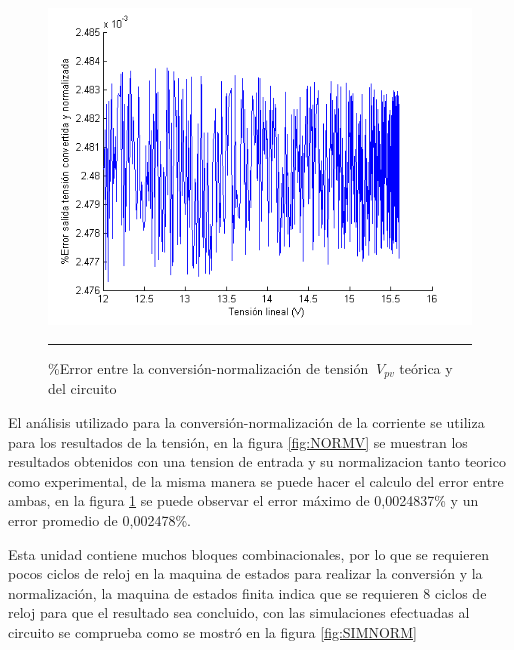   \begin{figure}[H]
  \centering
    \includegraphics[scale=0.7]{./ERROR_CONV_NORM_V.png}
    \rule{35em}{0.5pt}
  \caption[\%Error entre la conversión-normalización de tensión $\ V_{pv}$ teórica y del circuito]{\%Error entre la conversión-normalización de tensión $\ V_{pv}$ teórica y del circuito}
  \label{fig:ENORMV}
\end{figure}

El análisis utilizado para la conversión-normalización de la corriente se utiliza para los resultados de la tensión, en la figura \ref{fig:NORMV} se muestran los resultados obtenidos con una tension de entrada y su normalizacion tanto teorico como experimental, de la misma manera se puede hacer el calculo del error entre ambas, en la figura \ref{fig:ENORMV} se puede observar el error máximo de 0,0024837\% y un error promedio de 0,002478\%.

Esta unidad contiene muchos bloques combinacionales, por lo que se requieren pocos ciclos de reloj en la maquina de estados para realizar la conversión y la normalización, la maquina de estados finita indica que  se requieren 8 ciclos de reloj para que el resultado sea concluido, con las simulaciones efectuadas al circuito se comprueba como se mostró en la  figura \ref{fig:SIMNORM} 
